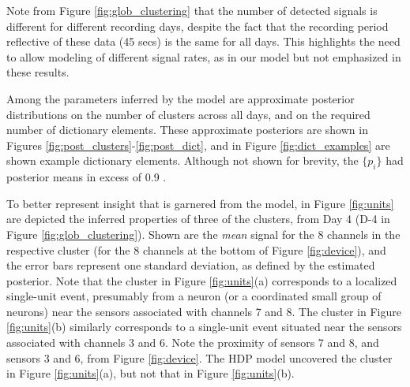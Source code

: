 \documentclass[journal]{IEEEtran}
\begin{document}
Note from Figure \ref{fig:glob_clustering} that the number of
detected signals is different for different recording days, despite
the fact that the recording period reflective of these data (45
secs) is the same for all days. This highlights the need to allow
modeling of different signal rates, as in our model but not
emphasized in these results.

Among the parameters inferred by the model are approximate posterior
distributions on the number of clusters across all days, and on the
required number of dictionary elements. These approximate posteriors
are shown in Figures \ref{fig:post_clusters}-\ref{fig:post_dict},
and in Figure \ref{fig:dict_examples} are shown example dictionary
elements. Although not shown for brevity, the $\{p_i\}$ had posterior means in excess of 0.9 .



To better represent insight that is garnered from the model, in Figure \ref{fig:units} are depicted the inferred properties of three of the clusters, from Day 4 (D-4 in Figure \ref{fig:glob_clustering}). Shown are the \emph{mean} signal for the 8 channels in the respective cluster (for the 8 channels at the bottom of Figure \ref{fig:device}), and the error bars represent one standard deviation, as defined by the estimated posterior. Note that the cluster in Figure \ref{fig:units}(a) corresponds to a localized single-unit event, presumably from a neuron (or a coordinated small group of neurons) near the sensors associated with channels 7 and 8. The cluster in Figure \ref{fig:units}(b) similarly corresponds to a single-unit event situated near the sensors associated with channels 3 and 6. Note the proximity of sensors 7 and 8, and sensors 3 and 6, from Figure \ref{fig:device}. The HDP model uncovered the cluster in Figure \ref{fig:units}(a), but not that in Figure \ref{fig:units}(b).
\end{document}
